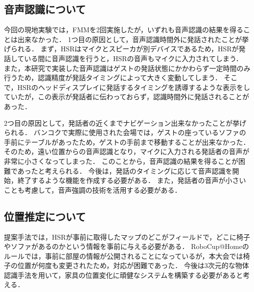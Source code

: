 \documentclass[a4j]{jarticle}
\begin{document}
\subsection{音声認識について}
今回の現地実験では，FMMを2回実施したが，いずれも音声認識の結果を得ることは出来なかった．
1つ目の原因として，音声認識時間外に発話されたことが挙げられる．
まず，HSRはマイクとスピーカが別デバイスであるため，HSRが発話している間に音声認識を行うと，HSRの音声もマイクに入力されてしまう．
また，本研究で実装した音声認識はゲストの発話状態にかかわらず一定時間のみ行うため，認識精度が発話タイミングによって大きく変動してしまう．
そこで，HSRのヘッドディスプレイに発話するタイミングを誘導するような表示をしていたが，この表示が発話者に伝わっておらず，認識時間外に発話されることがあった．

2つ目の原因として，発話者の近くまでナビゲーション出来なかったことが挙げられる．
バンコクで実際に使用された会場では，ゲストの座っているソファの手前にテーブルがあったため，ゲストの手前まで移動することが出来なかった．
そのため，遠い位置からの音声認識となり，マイクに入力される発話者の音声が非常に小さくなってしまった．
このことから，音声認識の結果を得ることが困難であったと考えられる．
今後は，発話のタイミングに応じて音声認識を開始，終了するような機能を作成する必要がある．
また，発話者の音声が小さいことも考慮して，音声強調\cite{voice_enhancement_1, voice_enhancement_2}の技術を活用する必要がある．

\subsection{位置推定について}
提案手法では，HSRが事前に取得したマップのどこがフィールドで，どこに椅子やソファがあるのかという情報を事前に与える必要がある．
RoboCup@Homeのルールでは，事前に部屋の情報が公開されることになっているが，本大会では椅子の位置が何度も変更されたため，対応が困難であった．
今後は3次元的な物体認識手法\cite{sun2022onepose}を用いて，家具の位置変化に頑健なシステムを構築する必要があると考える．
\end{document}
